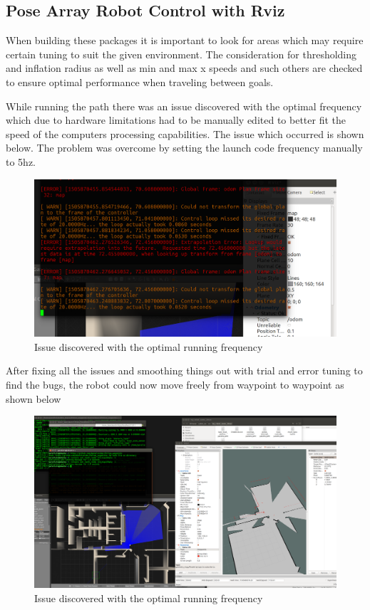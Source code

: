 \documentclass[a4paper, 10pt]{IEEEconf}
\begin{document}
\clearpage
\subsection{Pose Array Robot Control with Rviz}


When building these packages it is important to look for areas which may require certain tuning to suit the given environment. The consideration for thresholding and inflation radius as well as min and max x speeds and such others are checked to ensure optimal performance when traveling between goals. 

While running the path there was an issue discovered with the optimal frequency which due to hardware limitations had to be manually edited to better fit the speed of the computers processing capabilities. The issue which occurred is shown below. The problem was overcome by setting the launch code frequency manually to 5hz.

\begin{figure}[H]
  \includegraphics[width=0.8\linewidth, center]{images/error}
  \caption{Issue discovered with the optimal running frequency}
  \label{fig:Issue discovered with the optimal running frequency}
\end{figure}

After fixing all the issues and smoothing things out with trial and error tuning to find the bugs, the robot could now move freely from waypoint to waypoint as shown below

\begin{figure}[H]
  \includegraphics[width=0.8\linewidth, center]{images/total}
  \caption{Issue discovered with the optimal running frequency}
  \label{fig:Issue discovered with the optimal running frequency}
\end{figure}
\end{document}
